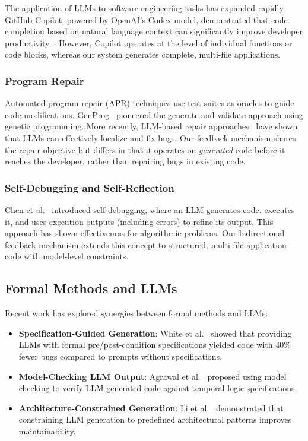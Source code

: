 \documentclass[11pt,a4paper]{article}
\begin{document}
{The application of LLMs to software engineering tasks has expanded rapidly. GitHub Copilot, powered by OpenAI's Codex model, demonstrated that code completion based on natural language context can significantly improve developer productivity~\cite{chen2021codex}. However, Copilot operates at the level of individual functions or code blocks, whereas our system generates complete, multi-file applications.

\subsubsection{Program Repair}

Automated program repair (APR) techniques use test suites as oracles to guide code modifications. GenProg~\cite{goues2012genprog} pioneered the generate-and-validate approach using genetic programming. More recently, LLM-based repair approaches~\cite{jiang2024llm} have shown that LLMs can effectively localize and fix bugs. Our feedback mechanism shares the repair objective but differs in that it operates on \emph{generated} code before it reaches the developer, rather than repairing bugs in existing code.

\subsubsection{Self-Debugging and Self-Reflection}

Chen et al.~\cite{chen2023self} introduced self-debugging, where an LLM generates code, executes it, and uses execution outputs (including errors) to refine its output. This approach has shown effectiveness for algorithmic problems. Our bidirectional feedback mechanism extends this concept to structured, multi-file application code with model-level constraints.

\subsection{Formal Methods and LLMs}

Recent work has explored synergies between formal methods and LLMs:

\begin{itemize}
    \item \textbf{Specification-Guided Generation}: White et al.~\cite{white2023prompt} showed that providing LLMs with formal pre/post-condition specifications yielded code with 40\% fewer bugs compared to prompts without specifications.
    \item \textbf{Model-Checking LLM Output}: Agrawal et al.~\cite{agrawal2023model} proposed using model checking to verify LLM-generated code against temporal logic specifications.
    \item \textbf{Architecture-Constrained Generation}: Li et al.~\cite{li2024combining} demonstrated that constraining LLM generation to predefined architectural patterns improves maintainability.
\end{itemize}

}
\end{document}
